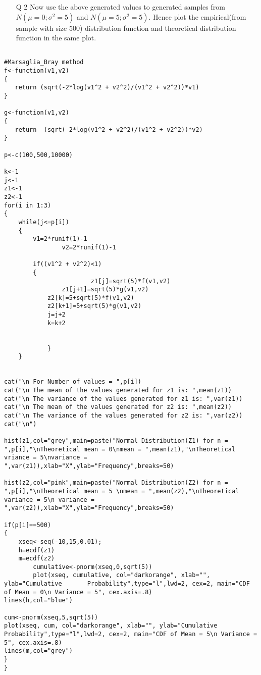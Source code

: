 \documentclass[11pt]{article}
\begin{document}
{{\begin{enumerate}
\item[Q 2]Now use the above generated values to generated samples from $N(\mu = 0;\sigma^2 = 5)$ and $N(\mu = 5;\sigma^2 = 5)$. Hence plot the empirical(from sample with size 500) distribution function and theoretical distribution function in the same plot.
\end{enumerate}


\begin{lstlisting}

#Marsaglia_Bray method
f<-function(v1,v2)
{
   return (sqrt(-2*log(v1^2 + v2^2)/(v1^2 + v2^2))*v1)
}

g<-function(v1,v2)
{
   return  (sqrt(-2*log(v1^2 + v2^2)/(v1^2 + v2^2))*v2)
}

p<-c(100,500,10000)

k<-1
j<-1
z1<-1
z2<-1
for(i in 1:3)
{	
	while(j<=p[i])
	{
		v1=2*runif(1)-1
                v2=2*runif(1)-1
		
		if((v1^2 + v2^2)<1)
		{
                        z1[j]=sqrt(5)*f(v1,v2)
       			z1[j+1]=sqrt(5)*g(v1,v2)
			z2[k]=5+sqrt(5)*f(v1,v2)
			z2[k+1]=5+sqrt(5)*g(v1,v2)
			j=j+2
 			k=k+2

                        
          	}	
	}


cat("\n For Number of values = ",p[i])
cat("\n The mean of the values generated for z1 is: ",mean(z1))
cat("\n The variance of the values generated for z1 is: ",var(z1))
cat("\n The mean of the values generated for z2 is: ",mean(z2))
cat("\n The variance of the values generated for z2 is: ",var(z2))
cat("\n")
	
hist(z1,col="grey",main=paste("Normal Distribution(Z1) for n =   ",p[i],"\nTheoretical mean = 0\nmean = ",mean(z1),"\nTheoretical vriance = 5\nvariance = ",var(z1)),xlab="X",ylab="Frequency",breaks=50)

hist(z2,col="pink",main=paste("Normal Distribution(Z2) for n =   ",p[i],"\nTheoretical mean = 5 \nmean = ",mean(z2),"\nTheoretical variance = 5\n variance = ",var(z2)),xlab="X",ylab="Frequency",breaks=50)

if(p[i]==500)
{
	xseq<-seq(-10,15,0.01);
	h=ecdf(z1)
	m=ecdf(z2)
        cumulative<-pnorm(xseq,0,sqrt(5))
        plot(xseq, cumulative, col="darkorange", xlab="", ylab="Cumulative       Probability",type="l",lwd=2, cex=2, main="CDF of Mean = 0\n Variance = 5", cex.axis=.8) 
lines(h,col="blue")

cum<-pnorm(xseq,5,sqrt(5))
plot(xseq, cum, col="darkorange", xlab="", ylab="Cumulative       Probability",type="l",lwd=2, cex=2, main="CDF of Mean = 5\n Variance = 5", cex.axis=.8)
lines(m,col="grey") 
}
}


\end{lstlisting}}}
\end{document}

